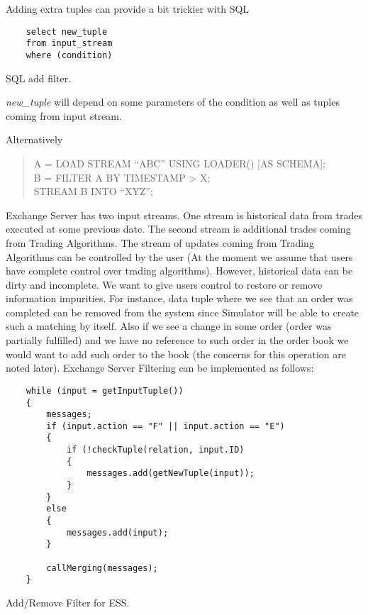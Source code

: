 \documentclass{article}
\begin{document}
Adding extra tuples can provide a bit trickier with SQL

\begin{program}
    \begin{verbatim}   
    select new_tuple
    from input_stream
    where (condition)
    \end{verbatim}
\caption{SQL add filter.}
\end{program}

\noindent \emph{new\_tuple} will depend on some parameters of the condition as well as tuples coming from input stream.

Alternatively

\begin{quote}
A = LOAD STREAM {}``ABC'' USING LOADER() {[}AS SCHEMA{]};\\
B = FILTER A BY TIMESTAMP > X;\\
STREAM B INTO {}``XYZ'';
\end{quote}

Exchange Server has two input streams. One stream is historical data from trades executed at some previous date. The second stream is additional trades coming from Trading Algorithms. The stream of updates coming from Trading Algorithms can be controlled by the user (At the moment we assume that users have complete control over trading algorithms). However, historical data can be dirty and incomplete. We want to give users control to restore or remove information impurities. For instance, data tuple where we see that an order was completed can be removed from the system since Simulator will be able to create such a matching by itself. Also if we see a change in some order (order was partially fulfilled) and we have no reference to such order in the order book we would want to add such order to the book (the concerns for this operation are noted later).
Exchange Server Filtering can be implemented as follows:

\begin{program}
    \begin{verbatim}   
    while (input = getInputTuple())
    {
        messages;
        if (input.action == "F" || input.action == "E")
        {
            if (!checkTuple(relation, input.ID)
            {
                messages.add(getNewTuple(input));
            }
        }
        else
        {
            messages.add(input);
        }
        
        callMerging(messages);
    }
    \end{verbatim}
\caption{Add/Remove Filter for ESS.}
\end{program}
\end{document}
